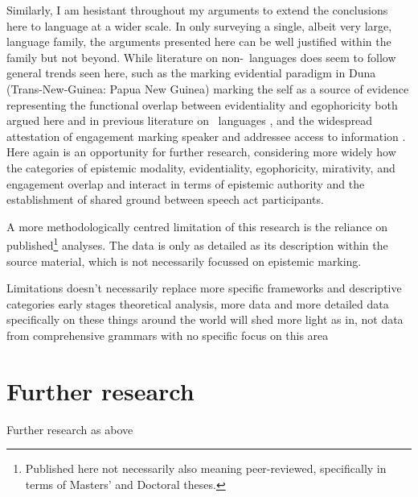 Similarly, I am hesistant throughout my arguments to extend the conclusions here to language at a wider scale. In only surveying a single, albeit very large, language family, the arguments presented here can be well justified within the family but not beyond. While literature on non-\lfam\ languages does seem to follow general trends seen here, such as the marking evidential paradigm in Duna (Trans-New-Guinea: Papua New Guinea) marking the self as a source of evidence \cite{SanRoque2012} representing the functional overlap between evidentiality and egophoricity both argued here and in previous literature on \lfam\ languages \cites{Gawne2017}{Hill2020}, and the widespread attestation of engagement marking speaker and addressee access to information \cite{EvansBergqvistSanRoque2018a}. Here again is an opportunity for further research, considering more widely how the categories of epistemic modality, evidentiality, egophoricity, mirativity, and engagement overlap and interact in terms of epistemic authority and the establishment of shared ground between speech act participants.

A more methodologically centred limitation of this research is the reliance on published\footnote{Published here not necessarily also meaning peer-reviewed, specifically in terms of Masters' and Doctoral theses.} analyses. The data is only as detailed as its description within the source material, which is not necessarily focussed on epistemic marking.

Limitations
doesn't necessarily replace more specific frameworks and descriptive categories
early stages theoretical analysis, more data and more detailed data specifically on these things around the world will shed more light
    as in, not data from comprehensive grammars with no specific focus on this area

\section{Further research}
Further research
as above